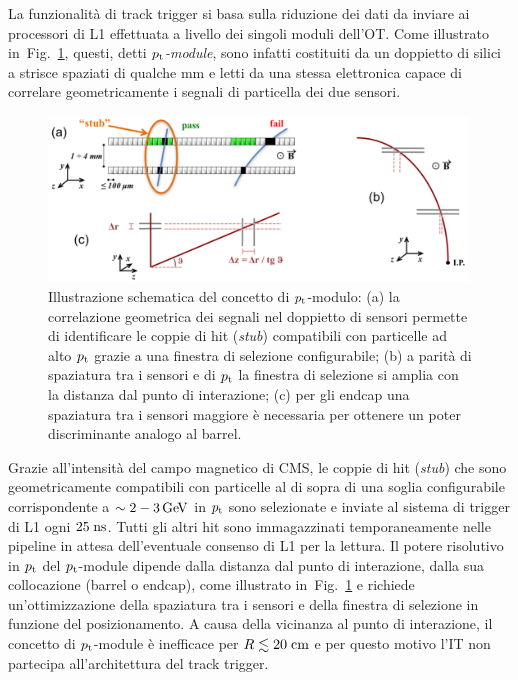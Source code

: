 La funzionalit\`a di track trigger si basa sulla riduzione dei dati da inviare ai processori di L1 effettuata a livello dei singoli moduli dell'OT. Come illustrato in~Fig.~\ref{fig:PtModuleConcept}, questi, detti {\em ${p_{\rm t}}$-module}, sono infatti costituiti da un doppietto di silici a strisce spaziati di qualche mm e letti da una stessa elettronica capace di correlare geometricamente i segnali di particella dei due sensori.
\begin{figure}
\centering
\includegraphics[width=0.99\textwidth]{Immagini/pt_module_concept.PNG}
\caption{Illustrazione schematica del concetto di ${p_{\rm t}}$-modulo: (a) la correlazione geometrica dei segnali nel doppietto di sensori permette di identificare le coppie di hit ({\em stub}) compatibili con particelle ad alto ${p_{\rm t}}$ grazie a una finestra di selezione configurabile; (b) a parit\`a di spaziatura tra i sensori e di ${p_{\rm t}}$ la finestra di selezione si amplia con la distanza dal punto di interazione; (c) per gli endcap una spaziatura tra i sensori maggiore \`e necessaria per ottenere un poter discriminante analogo al barrel.}
\label{fig:PtModuleConcept}
\end{figure}
Grazie all'intensit\`a del campo magnetico di CMS, le coppie di hit ({\em stub}) che sono geometricamente compatibili con particelle al di sopra di una soglia configurabile corrispondente a $\sim 2-3{\rm \, Ge\kern-0.125em V}$ in ${p_{\rm t}}$ sono selezionate e inviate al sistema di trigger di L1 ogni $25\rm \; ns$. Tutti gli altri hit sono immagazzinati temporaneamente nelle pipeline in attesa dell'eventuale consenso di L1 per la lettura. Il potere risolutivo in ${p_{\rm t}}$ del ${p_{\rm t}}$-module dipende dalla distanza dal punto di interazione, dalla sua collocazione (barrel o endcap), come illustrato in~Fig.~\ref{fig:PtModuleConcept} e richiede un'ottimizzazione della spaziatura tra i sensori e della finestra di selezione in funzione del posizionamento. 
A causa della vicinanza al punto di interazione, il concetto di ${p_{\rm t}}$-module \`e inefficace per $R\lesssim20\rm \; cm$ e per questo motivo l'IT non partecipa all'architettura del track trigger.

